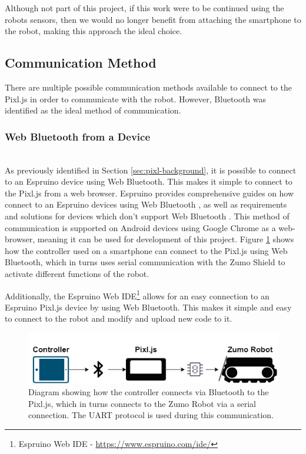 \documentclass{l4proj}
\begin{document}
Although not part of this project, if this work were to be continued using the robots sensors, then we would no longer benefit from attaching the smartphone to the robot, making this approach the ideal choice.


\subsection{Communication Method}\label{sec:communication method}
There are multiple possible communication methods available to connect to the Pixl.js in order to communicate with the robot. However, Bluetooth was identified as the ideal method of communication.

\subsubsection{Web Bluetooth from a Device} \hfill \\
As previously identified in Section \ref{sec:pixl-background}, it is possible to connect to an Espruino device using Web Bluetooth. This makes it simple to connect to the Pixl.js from a web browser. Espruino provides comprehensive guides on how connect to an Espruino devices using Web Bluetooth \citep{webbluetoothespruino}, as well as requirements and solutions for devices which don't support Web Bluetooth \citep{bluetoothquickstartespruino}. This method of communication is supported on Android devices using Google Chrome as a web-browser, meaning it can be used for development of this project. Figure \ref{fig:connection-general} shows how the controller used on a smartphone can connect to the Pixl.js using Web Bluetooth, which in turns uses serial communication with the Zumo Shield to activate different functions of the robot.

Additionally, the Espruino Web IDE\footnote{Espruino Web IDE - \url{https://www.espruino.com/ide/}} allows for an easy connection to an Espruino Pixl.js device by using Web Bluetooth. This makes it simple and easy to connect to the robot and modify and upload new code to it.

\begin{figure}[!ht]
    \centering
    \includegraphics[width=0.80\linewidth]{images/connection-general.png}
    \caption{Diagram showing how the controller connects via Bluetooth to the Pixl.js, which in turns connects to the Zumo Robot via a serial connection. The UART protocol is used during this communication.}
    \label{fig:connection-general}
\end{figure}
\end{document}
